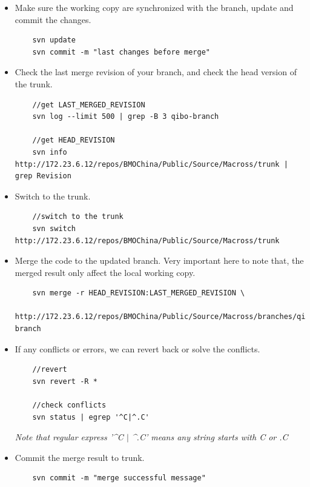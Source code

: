 \begin{itemize}
\item 
	Make sure the working copy are synchronized with the branch, update and commit the changes.
	\begin{lstlisting}
	svn update 
	svn commit -m "last changes before merge"
	\end{lstlisting}

\item 
	Check the last merge revision of your branch, and check the head version of the trunk.
	\begin{lstlisting}
	//get LAST_MERGED_REVISION
	svn log --limit 500 | grep -B 3 qibo-branch
	
	//get HEAD_REVISION 											  
	svn info http://172.23.6.12/repos/BMOChina/Public/Source/Macross/trunk | grep Revision  
	\end{lstlisting}

\item
	Switch to the trunk.
	\begin{lstlisting}
	//switch to the trunk
	svn switch http://172.23.6.12/repos/BMOChina/Public/Source/Macross/trunk	
	\end{lstlisting}

\item
	Merge the code to the updated branch. Very important here to note that, the merged result only affect the local working copy.
	\begin{lstlisting}
	svn merge -r HEAD_REVISION:LAST_MERGED_REVISION \
	  http://172.23.6.12/repos/BMOChina/Public/Source/Macross/branches/qibo-branch
	\end{lstlisting}

\item
	If any conflicts or errors, we can revert back or solve the conflicts.
	\begin{lstlisting}
	//revert	
	svn revert -R *
	
	//check conflicts
	svn status | egrep '^C|^.C'
	\end{lstlisting}
	\textit{Note that regular express '\^{}C $\vert$ \^{}.C' means any string starts with C or .C}

\item
	Commit the merge result to trunk.
	\begin{lstlisting}
	svn commit -m "merge successful message"
	\end{lstlisting}
\end{itemize}

